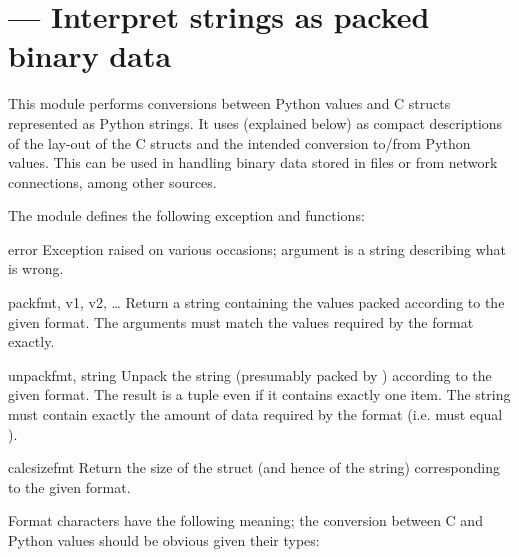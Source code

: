\section{ ---
         Interpret strings as packed binary data}



This module performs conversions between Python values and C
structs represented as Python strings.  It uses 
(explained below) as compact descriptions of the lay-out of the C
structs and the intended conversion to/from Python values.  This can
be used in handling binary data stored in files or from network
connections, among other sources.

The module defines the following exception and functions:


\begin{excdesc}{error}
  Exception raised on various occasions; argument is a string
  describing what is wrong.
\end{excdesc}

\begin{funcdesc}{pack}{fmt, v1, v2, \textrm{\ldots}}
  Return a string containing the values
   packed according to the given
  format.  The arguments must match the values required by the format
  exactly.
\end{funcdesc}

\begin{funcdesc}{unpack}{fmt, string}
  Unpack the string (presumably packed by ) according to the given format.  The result is a
  tuple even if it contains exactly one item.  The string must contain
  exactly the amount of data required by the format (i.e.
   must equal ).
\end{funcdesc}

\begin{funcdesc}{calcsize}{fmt}
  Return the size of the struct (and hence of the string)
  corresponding to the given format.
\end{funcdesc}

Format characters have the following meaning; the conversion between
C and Python values should be obvious given their types:

